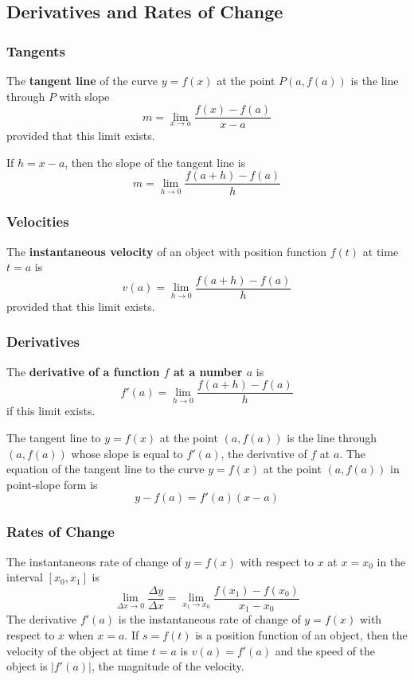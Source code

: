 \subsection{Derivatives and Rates of Change}

\subsubsection*{Tangents}
\begin{definition}
    The \textbf{tangent line} of the curve \(y=f(x)\) at the point
    \(P(a, f(a))\) is the line through \(P\) with slope
    \[m=\lim_{x\to a}\frac{f(x)-f(a)}{x-a}\]
    provided that this limit exists.
\end{definition}
If \(h=x-a\), then the slope of the tangent line is
\[m=\lim_{h\to 0}\frac{f(a+h)-f(a)}{h}\]

\subsubsection*{Velocities}
\begin{definition}
    The \textbf{instantaneous velocity} of an object with position function
    \(f(t)\) at time \(t=a\) is
    \[v(a)=\lim_{h\to 0}\frac{f(a+h)-f(a)}{h}\]
    provided that this limit exists.
\end{definition}

\subsubsection*{Derivatives}
\begin{definition}
    The \textbf{derivative of a function \(f\) at a number \(a\)} is
    \[f'(a)=\lim_{h\to 0}\frac{f(a+h)-f(a)}{h}\]
    if this limit exists.
\end{definition}
The tangent line to \(y=f(x)\) at the point \((a,f(a))\) is the line through
\((a,f(a))\) whose slope is equal to \(f'(a)\),
the derivative of \(f\) at \(a\).
The equation of the tangent line to the curve \(y=f(x)\) at the point
\((a,f(a))\) in point-slope form is
\[y-f(a)=f'(a)(x-a)\]

\subsubsection*{Rates of Change}
The instantaneous rate of change of \(y=f(x)\) with respect to \(x\) at
\(x=x_0\) in the interval \([x_0,x_1]\) is
\[\lim_{\Delta x\to 0}\frac{\Delta y}{\Delta x}
=\lim_{x_1 \to x_0}\frac{f(x_1)-f(x_0)}{x_1-x_0}\]
The derivative \(f'(a)\) is the instantaneous rate of change of \(y=f(x)\)
with respect to \(x\) when \(x=a\).
If \(s=f(t)\) is a position function of an object, then the velocity of the
object at time \(t=a\) is \(v(a)=f'(a)\) and the speed of the object is
\(|f'(a)|\), the magnitude of the velocity.